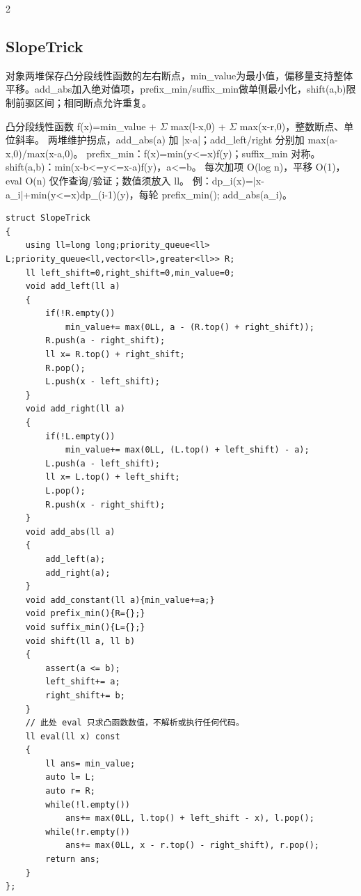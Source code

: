 \documentclass[UTF8,fontset=fandol,a4paper,twoside]{ctexart}
\newcommand{\note}[1]{{\fontsize{10}{12}\selectfont #1\par}}
\begin{document}
\begin{multicols}{2}
\subsection{SlopeTrick}

\note{对象两堆保存凸分段线性函数的左右断点，min\_value为最小值，偏移量支持整体平移。add\_abs加入绝对值项，prefix\_min/\allowbreak{}suffix\_min做单侧最小化，shift(\allowbreak{}a,\allowbreak{}b)\allowbreak{}限制前驱区间；相同断点允许重复。}
\note{凸分段线性函数 f(\allowbreak{}x)\allowbreak{}=\allowbreak{}min\_value +\allowbreak{} \ensuremath{\Sigma} max(\allowbreak{}l-\allowbreak{}x,\allowbreak{}0)\allowbreak{} +\allowbreak{} \ensuremath{\Sigma} max(\allowbreak{}x-\allowbreak{}r,\allowbreak{}0)\allowbreak{}，整数断点、单位斜率。 两堆维护拐点，add\_abs(\allowbreak{}a)\allowbreak{} 加 |x-\allowbreak{}a|；add\_left/\allowbreak{}right 分别加 max(\allowbreak{}a-\allowbreak{}x,\allowbreak{}0)\allowbreak{}/\allowbreak{}max(\allowbreak{}x-\allowbreak{}a,\allowbreak{}0)\allowbreak{}。 prefix\_min：f(\allowbreak{}x)\allowbreak{}=\allowbreak{}min(\allowbreak{}y<\allowbreak{}=\allowbreak{}x)\allowbreak{}f(\allowbreak{}y)\allowbreak{}；suffix\_min 对称。shift(\allowbreak{}a,\allowbreak{}b)\allowbreak{}：min(\allowbreak{}x-\allowbreak{}b<\allowbreak{}=\allowbreak{}y<\allowbreak{}=\allowbreak{}x-\allowbreak{}a)\allowbreak{}f(\allowbreak{}y)\allowbreak{}，a<\allowbreak{}=\allowbreak{}b。 每次加项 O(\allowbreak{}log n)\allowbreak{}，平移 O(\allowbreak{}1)\allowbreak{}，eval O(\allowbreak{}n)\allowbreak{} 仅作查询/\allowbreak{}验证；数值须放入 ll。 例：dp\_i(\allowbreak{}x)\allowbreak{}=\allowbreak{}|x-\allowbreak{}a\_i|+\allowbreak{}min(\allowbreak{}y<\allowbreak{}=\allowbreak{}x)\allowbreak{}dp\_(\allowbreak{}i-\allowbreak{}1)\allowbreak{}(\allowbreak{}y)\allowbreak{}，每轮 prefix\_min(\allowbreak{})\allowbreak{}; add\_abs(\allowbreak{}a\_i)\allowbreak{}。}
\begin{lstlisting}
struct SlopeTrick
{
    using ll=long long;priority_queue<ll> L;priority_queue<ll,vector<ll>,greater<ll>> R;
    ll left_shift=0,right_shift=0,min_value=0;
    void add_left(ll a)
    {
        if(!R.empty())
            min_value+= max(0LL, a - (R.top() + right_shift));
        R.push(a - right_shift);
        ll x= R.top() + right_shift;
        R.pop();
        L.push(x - left_shift);
    }
    void add_right(ll a)
    {
        if(!L.empty())
            min_value+= max(0LL, (L.top() + left_shift) - a);
        L.push(a - left_shift);
        ll x= L.top() + left_shift;
        L.pop();
        R.push(x - right_shift);
    }
    void add_abs(ll a)
    {
        add_left(a);
        add_right(a);
    }
    void add_constant(ll a){min_value+=a;}
    void prefix_min(){R={};}
    void suffix_min(){L={};}
    void shift(ll a, ll b)
    {
        assert(a <= b);
        left_shift+= a;
        right_shift+= b;
    }
    // 此处 eval 只求凸函数数值，不解析或执行任何代码。
    ll eval(ll x) const
    {
        ll ans= min_value;
        auto l= L;
        auto r= R;
        while(!l.empty())
            ans+= max(0LL, l.top() + left_shift - x), l.pop();
        while(!r.empty())
            ans+= max(0LL, x - r.top() - right_shift), r.pop();
        return ans;
    }
};
\end{lstlisting}

\end{multicols}
\end{document}
